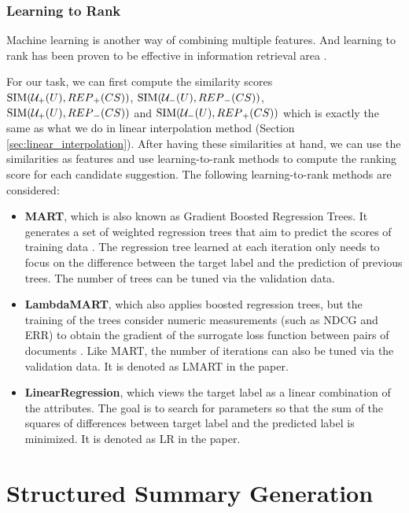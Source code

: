 \subsubsection{Learning to Rank} 
\label{sec:learning_to_rank}

Machine learning is another way of combining multiple 
features. And learning to rank has been proven to be effective in 
information retrieval area 
\cite{Liu:2009:LRI:1618303.1618304, 
Macdonald:2013:WHL:2559123.2559126}. 

For our task, we can first compute the similarity scores 
\\$\mathrm{SIM}({\cal U}_{+}(U),{REP}_{+}(CS))$, 
$\mathrm{SIM}({\cal U}_{-}(U),{REP}_{-}(CS))$, 
\\$\mathrm{SIM}({\cal U}_{+}(U),{REP}_{-}(CS))$ and 
$\mathrm{SIM}({\cal U}_{-}(U),{REP}_{+}(CS))$ 
which is exactly the same as what we do in linear 
interpolation method (Section \ref{sec:linear_interpolation}).
After having these similarities at hand, we can use the 
similarities as features and use learning-to-rank 
methods to compute the ranking score for each candidate 
suggestion. The following learning-to-rank methods 
are considered: 
\begin{itemize}
\item \textbf{MART}, which is also known as Gradient Boosted 
Regression Trees. It generates a set of weighted regression 
trees that aim to predict the scores of training data 
\cite{Friedman00greedyfunction}. The regression tree learned 
at each iteration only needs to focus on the difference 
between the target label and the prediction of previous 
trees. The number of trees can be tuned via the validation 
data.
\item \textbf{LambdaMART}, which also applies boosted 
regression trees, but the training of the trees consider 
numeric measurements (such as NDCG and ERR) to obtain the 
gradient of the surrogate loss function between pairs of 
documents \cite{burges2010ranknet}. 
Like MART, the number of iterations can also be 
tuned via the validation data. It is denoted as LMART 
in the paper. 
\item \textbf{LinearRegression}, which views the target label 
as a linear combination of the attributes. The goal is to 
search for parameters so that the sum of the squares of 
differences between target label and the predicted label is 
minimized. It is denoted as LR in the paper. 
\end{itemize} 

\section {Structured Summary Generation}  
\label{sec:summ} 

